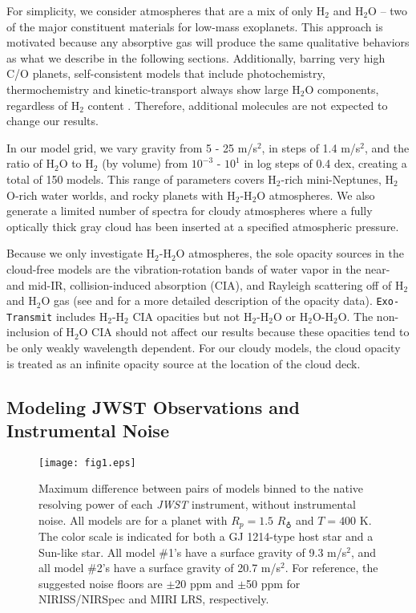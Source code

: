 \documentclass[iop]{emulateapj}
\begin{document}
For simplicity, we consider atmospheres that are a mix of only H$_2$ and H$_2$O -- two of the major constituent materials for low-mass exoplanets.  This approach is motivated because any absorptive gas will produce the same qualitative behaviors as what we describe in the following sections. Additionally, barring very high C/O planets, self-consistent models that include photochemistry, thermochemistry and kinetic-transport always show large H$_2$O components, regardless of H$_2$ content \citep{hu14}. Therefore, additional molecules are not expected to change our results.

In our model grid, we vary gravity from 5 - 25 m/s$^2$, in steps of 1.4 m/s$^2$, and the ratio of H$_2$O to H$_2$ (by volume) from $10^{-3}$ - $10^{1}$ in log steps of 0.4 dex, creating a total of 150 models. This range of parameters covers H$_2$-rich mini-Neptunes, H$_2$O-rich water worlds, and rocky planets with H$_2$-H$_2$O atmospheres.  We also generate a limited number of spectra for cloudy atmospheres where a fully optically thick gray cloud has been inserted at a specified atmospheric pressure.

Because we only investigate H$_2$-H$_2$O atmospheres, the sole opacity sources in the cloud-free models are the vibration-rotation bands of water vapor in the near- and mid-IR, collision-induced absorption (CIA), and Rayleigh scattering off of H$_2$ and H$_2$O gas (see \citet{fre08, fre14} and \citet{lup14} for a more detailed description of the opacity data).  \texttt{Exo-Transmit} includes H$_2$-H$_2$ CIA opacities but not H$_2$-H$_2$O or H$_2$O-H$_2$O.  The non-inclusion of H$_2$O CIA should not affect our results because these opacities tend to be only weakly wavelength dependent.  For our cloudy models, the cloud opacity is treated as an infinite opacity source at the location of the cloud deck.

\subsection{Modeling JWST Observations and Instrumental Noise \label{sec:noise}}

\begin{figure*}[ht]
\centering
 \texttt{[image: fig1.eps]}
\caption{Maximum difference between pairs of models binned to the native resolving power of each \emph{JWST} instrument, without instrumental noise.  All models are for a planet with $R_p=1.5$ $R_\earth$ and $T=400$ K. The color scale is indicated for both a GJ 1214-type host star and a Sun-like star. All model \#1's have a surface gravity of 9.3 m/s$^2$, and all model \#2's have a surface gravity of 20.7 m/s$^2$. For reference, the suggested noise floors are $\pm$20 ppm and $\pm$50 ppm for NIRISS/NIRSpec and MIRI LRS, respectively. \label{fig1}}
\end{figure*}
\end{document}
